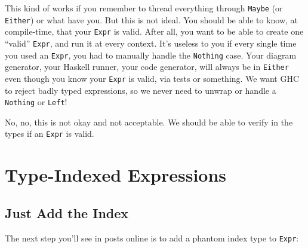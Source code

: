 \documentclass[]{article}
\begin{document}
This kind of works if you remember to thread everything through \texttt{Maybe}
(or \texttt{Either}) or what have you. But this is not ideal. You should be able
to know, at compile-time, that your \texttt{Expr} is valid. After all, you want
to be able to create one ``valid'' \texttt{Expr}, and run it at every context.
It's useless to you if every single time you used an \texttt{Expr}, you had to
manually handle the \texttt{Nothing} case. Your diagram generator, your Haskell
runner, your code generator, will always be in \texttt{Either} even though you
know your \texttt{Expr} is valid, via tests or something. We want GHC to reject
badly typed expressions, so we never need to unwrap or handle a \texttt{Nothing}
or \texttt{Left}!

No, no, this is not okay and not acceptable. We should be able to verify in the
types if an \texttt{Expr} is valid.

\section{Type-Indexed Expressions}\label{type-indexed-expressions}

\subsection{Just Add the Index}\label{just-add-the-index}

The next step you'll see in posts online is to add a phantom index type to
\texttt{Expr}:
\end{document}
